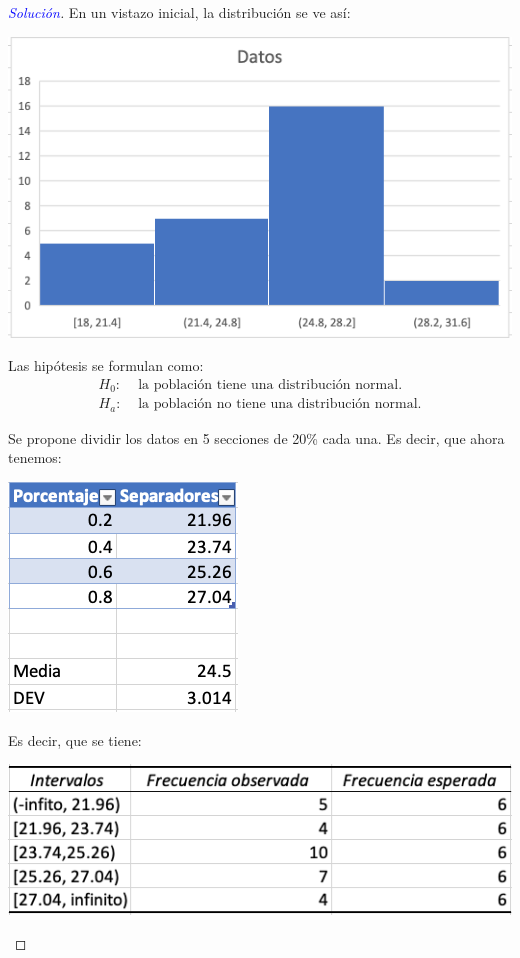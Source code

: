 \documentclass[a4paper,12pt]{article}
\newenvironment{solution}
  {\renewcommand\qedsymbol{$\square$}\begin{proof}[\textcolor{blue}{Solución}]}
  {\end{proof}}
\begin{document}
\begin{solution}
En un vistazo inicial, la distribución se ve así: \begin{center}
    \includegraphics[scale=0.45]{images/Screen Shot 2021-05-11 at 16.29.48.png}
\end{center}
Las hipótesis se formulan como: 
\begin{align*}
    H_0: & \text{ la población tiene una distribución normal.}\\ 
    H_a: & \text{  la población no tiene una distribución normal.}
\end{align*}

Se propone dividir los datos en 5 secciones de 20\% cada una. Es decir, que ahora tenemos: 
\begin{center}
    \includegraphics[scale=0.45]{images/Screen Shot 2021-05-11 at 16.38.17.png}
\end{center}

Es decir, que se tiene: 
\begin{center}
    \includegraphics[scale=0.45]{images/Screen Shot 2021-05-11 at 16.45.10.png}
\end{center}


\end{solution}
\end{document}
